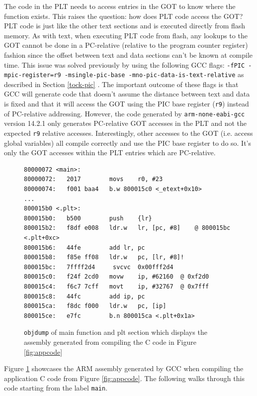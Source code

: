 \documentclass[12pt]{ucsddissertation}
\begin{document}
The code in the PLT needs to access entries in the GOT to know where the function exists. This raises the question: how does PLT code access the GOT? PLT code is just like the other text sections and is executed directly from flash memory. As with text, when executing PLT code from flash, any lookups to the GOT cannot be done in a PC-relative (relative to the program counter register) fashion since the offset between text and data sections can't be known at compile time. This issue was solved previously by using the following GCC flags: \texttt{-fPIC -mpic-register=r9 -msingle-pic-base -mno-pic-data-is-text-relative} as described in Section \ref{tock-pic} \cite{tock-compilation}. The important outcome of these flags is that GCC will generate code that doesn't assume the distance between text and data is fixed and that it will access the GOT using the PIC base register (\texttt{r9}) instead of PC-relative addressing. However, the code generated by \texttt{arm-none-eabi-gcc} version 14.2.1 only generates PC-relative GOT accesses in the PLT and not the expected \texttt{r9} relative accesses. Interestingly, other accesses to the GOT (i.e. access global variables) all compile correctly and use the PIC base register to do so. It's only the GOT accesses within the PLT entries which are PC-relative.

\begin{figure}[!h]
\begin{verbatim}
80000072 <main>:
80000072:	2017      	movs	r0, #23
80000074:	f001 baa4 	b.w	800015c0 <_etext+0x10>
...
800015b0 <.plt>:
800015b0:	b500      	push	{lr}
800015b2:	f8df e008 	ldr.w	lr, [pc, #8]	@ 800015bc <.plt+0xc>
800015b6:	44fe      	add	lr, pc
800015b8:	f85e ff08 	ldr.w	pc, [lr, #8]!
800015bc:	7ffff2d4 	 svcvc	0x00fff2d4
800015c0:	f24f 2cd0 	movw	ip, #62160	@ 0xf2d0
800015c4:	f6c7 7cff 	movt	ip, #32767	@ 0x7fff
800015c8:	44fc      	add	ip, pc
800015ca:	f8dc f000 	ldr.w	pc, [ip]
800015ce:	e7fc      	b.n	800015ca <.plt+0x1a>

\end{verbatim}
    \caption[\texttt{objdump} of Incorrect PLT Code Generation]{\texttt{objdump} of main function and plt section which displays the assembly generated from compiling the C code in Figure \ref{fig:appcode} \cite{objdump}}
    \label{fig:incorrectplt}
\end{figure}

Figure \ref{fig:incorrectplt} showcases the ARM assembly generated by GCC when compiling the application C code from Figure \ref{fig:appcode}. The following walks through this code starting from the label \texttt{main}.
\end{document}
